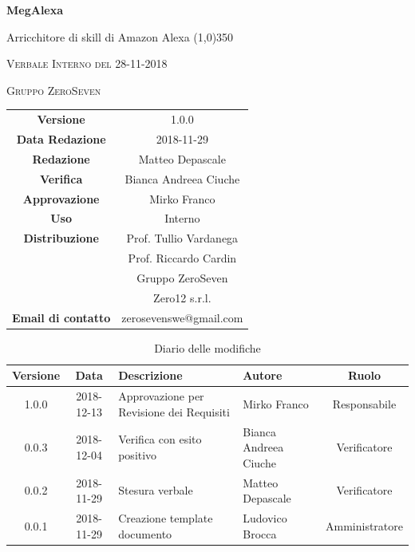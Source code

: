 \documentclass[a4paper,12pt]{article}
\author{Matteo Depascale}
\date{2018-11-29}
\begin{document}
\begin{titlepage}
	\centering
	{\huge\bfseries MegAlexa\par}
	Arricchitore di skill di Amazon Alexa
	\line(1,0){350} \\
	{\scshape\LARGE Verbale Interno del 28-11-2018 \par}
	\vspace{1cm}
	{\scshape Gruppo ZeroSeven \par}
	\logo
	\begin{tabular}{c|c}
		{\hfill \textbf{Versione}} 			& 1.0.0				\\
		{\hfill\textbf{Data Redazione}} 	& 2018-11-29		\\ 
		{\hfill\textbf{Redazione}} 			&  		Matteo Depascale			\\ 
		{\hfill\textbf{Verifica}} 				&  		Bianca Andreea Ciuche		\\ 
		{\hfill\textbf{Approvazione}} 		&  		Mirko Franco	\\ 
		{\hfill\textbf{Uso}} 					& 	Interno	\\ 
		{\hfill\textbf{Distribuzione}} 			& 			Prof. Tullio Vardanega \\ & Prof. Riccardo Cardin \\ & Gruppo ZeroSeven		\\ & Zero12 s.r.l. \\ 
		{\hfill\textbf{Email di contatto}} & zerosevenswe@gmail.com \\
	\end{tabular}
\end{titlepage}
	

	
	\label{LastFrontPage}
	

	\newpage
	\cleardoublepage
		\begin{table}[tbph]
		\centering
		\begin{tabularx}{\textwidth}{|c|c|X|X|c|}
			\hline
			\textbf{Versione} & \textbf{Data} & \textbf{Descrizione} & \textbf{Autore} & \textbf{Ruolo} \\
			\hline
			1.0.0 & 2018-12-13 & Approvazione per Revisione dei Requisiti
			& Mirko Franco & Responsabile \\
			\hline
			0.0.3 & 2018-12-04 & Verifica con esito positivo
			& Bianca Andreea Ciuche & Verificatore \\
			\hline
			0.0.2 & 2018-11-29 & Stesura verbale & Matteo Depascale & Verificatore \\
			\hline
			0.0.1 & 2018-11-29 & Creazione template documento
			& Ludovico Brocca & Amministratore \\
			\hline
		\end{tabularx}
		\caption{Diario delle modifiche}
	\end{table}
	
\end{document}

